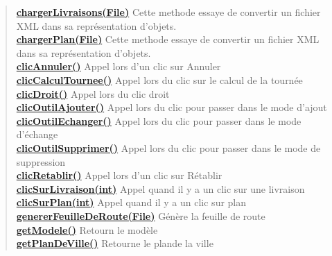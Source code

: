\documentclass[11pt,a4paper]{report}
\begin{document}
{{{{\begin{verse}
\hyperlink{controleur.ControleurInterface.chargerLivraisons(java.io.File)}{{\bf chargerLivraisons(File)}} Cette methode essaye de convertir un fichier XML dans sa représentation d'objets.\\
\hyperlink{controleur.ControleurInterface.chargerPlan(java.io.File)}{{\bf chargerPlan(File)}} Cette methode essaye de convertir un fichier XML dans sa représentation d'objets.\\
\hyperlink{controleur.ControleurInterface.clicAnnuler()}{{\bf clicAnnuler()}} Appel lors d'un clic sur Annuler\\
\hyperlink{controleur.ControleurInterface.clicCalculTournee()}{{\bf clicCalculTournee()}} Appel lors du clic sur le calcul de la tournée\\
\hyperlink{controleur.ControleurInterface.clicDroit()}{{\bf clicDroit()}} Appel lors du clic droit\\
\hyperlink{controleur.ControleurInterface.clicOutilAjouter()}{{\bf clicOutilAjouter()}} Appel lors du clic pour passer dans le mode d'ajout\\
\hyperlink{controleur.ControleurInterface.clicOutilEchanger()}{{\bf clicOutilEchanger()}} Appel lors du clic pour passer dans le mode d'échange\\
\hyperlink{controleur.ControleurInterface.clicOutilSupprimer()}{{\bf clicOutilSupprimer()}} Appel lors du clic pour passer dans le mode de suppression\\
\hyperlink{controleur.ControleurInterface.clicRetablir()}{{\bf clicRetablir()}} Appel lors d'un clic sur Rétablir\\
\hyperlink{controleur.ControleurInterface.clicSurLivraison(int)}{{\bf clicSurLivraison(int)}} Appel quand il y a un clic sur une livraison\\
\hyperlink{controleur.ControleurInterface.clicSurPlan(int)}{{\bf clicSurPlan(int)}} Appel quand il y a un clic sur plan\\
\hyperlink{controleur.ControleurInterface.genererFeuilleDeRoute(java.io.File)}{{\bf genererFeuilleDeRoute(File)}} Génère la feuille de route\\
\hyperlink{controleur.ControleurInterface.getModele()}{{\bf getModele()}} Retourn le modèle\\
\hyperlink{controleur.ControleurInterface.getPlanDeVille()}{{\bf getPlanDeVille()}} Retourne le plande la ville\\
\end{verse}
}
}}}
\end{document}
